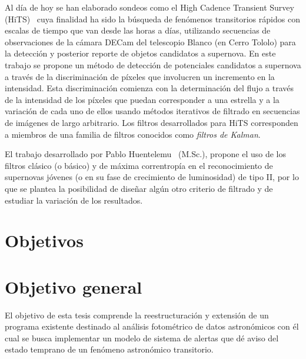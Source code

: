 Al d\'ia de hoy se han elaborado sondeos como el High Cadence Transient Survey (HiTS)~\cite{hits} cuya finalidad ha sido la b\'usqueda de fen\'omenos transitorios r\'apidos con escalas de tiempo que van desde las horas a d\'ias, utilizando secuencias de observaciones de la c\'amara DECam del telescopio Blanco (en Cerro Tololo) para la detecci\'on y posterior reporte de objetos candidatos a supernova. En este trabajo se propone un m\'etodo de detecci\'on de potenciales candidatos a supernova a trav\'es de la discriminaci\'on de p\'ixeles que involucren un incremento en la intensidad. Esta discriminaci\'on comienza con la determinaci\'on del flujo a trav\'es de la intensidad de los p\'ixeles que puedan corresponder a una estrella y a la variaci\'on de cada uno de ellos usando m\'etodos iterativos de filtrado en secuencias de im\'agenes de largo arbitrario. Los filtros desarrollados para HiTS corresponden a miembros de una familia de filtros conocidos como \textit{filtros de Kalman}.%
\bigskip


El trabajo desarrollado por Pablo Huentelemu~\cite{huentelemu} (M.Sc.), propone el uso de los filtros cl\'asico (o b\'asico) \cite{kalman} y de m\'axima correntrop\'ia \cite{chen} en el reconocimiento de supernovas j\'ovenes (o en su fase de crecimiento de luminosidad) de tipo II, por lo que se plantea la posibilidad de dise\~nar alg\'un otro criterio de filtrado y de estudiar la variaci\'on de los resultados.
\bigskip



\section{Objetivos}
\section{Objetivo general}
El objetivo de esta tesis comprende la reestructuraci\'on y extensi\'on de un programa existente destinado al an\'alisis fotom\'etrico de datos astron\'omicos con \'el cual se busca implementar un modelo de sistema de alertas que d\'e aviso del estado temprano de un fen\'omeno astron\'omico transitorio. 
\bigskip

